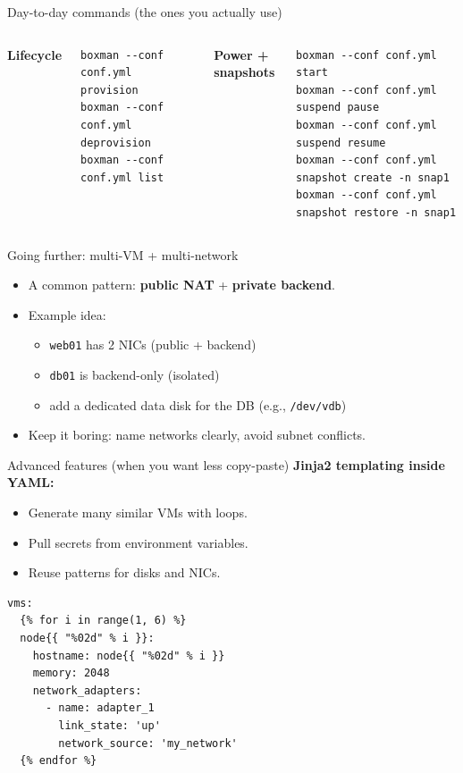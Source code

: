 \documentclass[aspectratio=169]{beamer}
\begin{document}
\begin{frame}[fragile]{Day-to-day commands (the ones you actually use)}
\begin{columns}[T,onlytextwidth]
  \textbf{Lifecycle}
  \begin{lstlisting}[style=boxman]
boxman --conf conf.yml provision
boxman --conf conf.yml deprovision
boxman --conf conf.yml list
  \end{lstlisting}

  \textbf{Power + snapshots}
  \begin{lstlisting}[style=boxman]
boxman --conf conf.yml start
boxman --conf conf.yml suspend pause
boxman --conf conf.yml suspend resume
boxman --conf conf.yml snapshot create -n snap1
boxman --conf conf.yml snapshot restore -n snap1
  \end{lstlisting}
\end{columns}
\end{frame}

\begin{frame}[fragile]{Going further: multi-VM + multi-network}
\begin{itemize}
  \item A common pattern: \textbf{public NAT} + \textbf{private backend}.
  \item Example idea:
    \begin{itemize}
      \item \texttt{web01} has 2 NICs (public + backend)
      \item \texttt{db01} is backend-only (isolated)
      \item add a dedicated data disk for the DB (e.g., \texttt{/dev/vdb})
    \end{itemize}
  \item Keep it boring: name networks clearly, avoid subnet conflicts.
\end{itemize}
\end{frame}

\begin{frame}[fragile]{Advanced features (when you want less copy-paste)}
\textbf{Jinja2 templating inside YAML:}
\begin{itemize}
  \item Generate many similar VMs with loops.
  \item Pull secrets from environment variables.
  \item Reuse patterns for disks and NICs.
\end{itemize}
\vspace{0.5em}
\begin{lstlisting}[style=boxman]
vms:
  {% for i in range(1, 6) %}
  node{{ "%02d" % i }}:
    hostname: node{{ "%02d" % i }}
    memory: 2048
    network_adapters:
      - name: adapter_1
        link_state: 'up'
        network_source: 'my_network'
  {% endfor %}
\end{lstlisting}
\end{frame}
\end{document}
